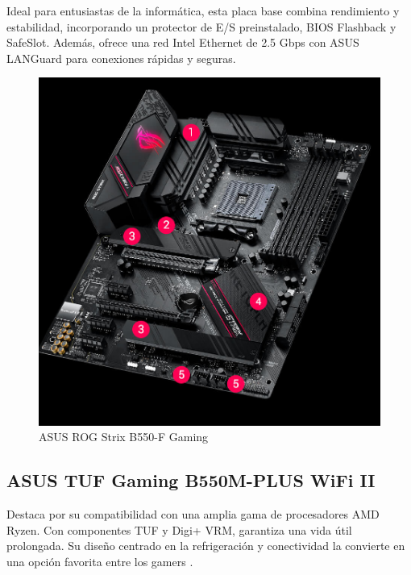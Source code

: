 Ideal para entusiastas de la informática, esta placa base combina rendimiento y estabilidad, incorporando un protector de E/S preinstalado, BIOS Flashback y SafeSlot. Además, ofrece una red Intel Ethernet de 2.5 Gbps con ASUS LANGuard para conexiones rápidas y seguras\cite{lavanguardiaB550F}.

\begin{figure}[H]
  \centering
  \includegraphics[scale=0.1]{imagenes/strix.png}
  \caption{ASUS ROG Strix B550-F Gaming}
\end{figure}

\subsection{ASUS TUF Gaming B550M-PLUS WiFi II}

Destaca por su compatibilidad con una amplia gama de procesadores AMD Ryzen. Con componentes TUF y Digi+ VRM, garantiza una vida útil prolongada. Su diseño centrado en la refrigeración y conectividad la convierte en una opción favorita entre los gamers \cite{lavanguardiaTUF}.

